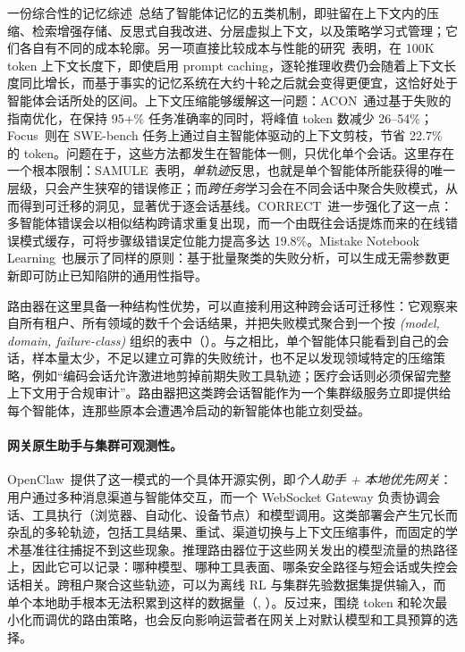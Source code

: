 一份综合性的记忆综述~\cite{memorysurv2026}总结了智能体记忆的五类机制，即驻留在上下文内的压缩、检索增强存储、反思式自我改进、分层虚拟上下文，以及策略学习式管理；它们各自有不同的成本轮廓。另一项直接比较成本与性能的研究~\cite{memcost2026}表明，在 100K token 上下文长度下，即使启用 prompt caching，逐轮推理收费仍会随着上下文长度同比增长，而基于事实的记忆系统在大约十轮之后就会变得更便宜，这恰好处于智能体会话所处的区间。上下文压缩能够缓解这一问题：ACON~\cite{acon2025}通过基于失败的指南优化，在保持 95+\% 任务准确率的同时，将峰值 token 数减少 26--54\%；Focus~\cite{focus2026}则在 SWE-bench 任务上通过自主智能体驱动的上下文剪枝，节省 22.7\% 的 token。问题在于，这些方法都发生在智能体一侧，只优化单个会话。这里存在一个根本限制：SAMULE~\cite{samule2025}表明，\emph{单轨迹}反思，也就是单个智能体所能获得的唯一层级，只会产生狭窄的错误修正；而\emph{跨任务}学习会在不同会话中聚合失败模式，从而得到可迁移的洞见，显著优于逐会话基线。CORRECT~\cite{correct2025}进一步强化了这一点：多智能体错误会以相似结构跨请求重复出现，而一个由既往会话提炼而来的在线错误模式缓存，可将步骤级错误定位能力提高多达 19.8\%。Mistake Notebook Learning~\cite{mnl2025}也展示了同样的原则：基于批量聚类的失败分析，可以生成无需参数更新即可防止已知陷阱的通用性指导。

路由器在这里具备一种结构性优势，可以直接利用这种跨会话可迁移性：它观察来自所有租户、所有领域的数千个会话结果，并把失败模式聚合到一个按 \emph{(model, domain, failure-class)} 组织的表中（）。与之相比，单个智能体只能看到自己的会话，样本量太少，不足以建立可靠的失败统计，也不足以发现领域特定的压缩策略，例如“编码会话允许激进地剪掉前期失败工具轨迹；医疗会话则必须保留完整上下文用于合规审计”。路由器把这类跨会话智能作为一个集群级服务立即提供给每个智能体，连那些原本会遭遇冷启动的新智能体也能立刻受益。

\paragraph{网关原生助手与集群可观测性。}
OpenClaw~\cite{openclaw2026}提供了这一模式的一个具体开源实例，即\emph{个人助手 + 本地优先网关}：用户通过多种消息渠道与智能体交互，而一个 WebSocket Gateway 负责协调会话、工具执行（浏览器、自动化、设备节点）和模型调用。这类部署会产生冗长而杂乱的多轮轨迹，包括工具结果、重试、渠道切换与上下文压缩事件，而固定的学术基准往往捕捉不到这些现象。推理路由器位于这些网关发出的模型流量的热路径上，因此它可以记录：哪种模型、哪种工具表面、哪条安全路径与短会话或失控会话相关。跨租户聚合这些轨迹，可以为离线 RL 与集群先验数据集提供输入，而单个本地助手根本无法积累到这样的数据量（, ）。反过来，围绕 token 和轮次最小化而调优的路由策略，也会反向影响运营者在网关上对默认模型和工具预算的选择。

